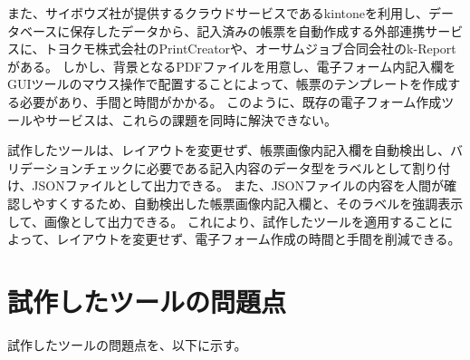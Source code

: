 また、サイボウズ社が提供するクラウドサービスであるkintone\cite{kintone}を利用し、データベースに保存したデータから、記入済みの帳票を自動作成する外部連携サービスに、トヨクモ株式会社のPrintCreator\cite{PrintCreator}や、オーサムジョブ合同会社のk-Report\cite{k-Report}がある。
しかし、背景となるPDFファイルを用意し、電子フォーム内記入欄をGUIツールのマウス操作で配置することによって、帳票のテンプレートを作成する必要があり、手間と時間がかかる。
このように、既存の電子フォーム作成ツールやサービスは、これらの課題を同時に解決できない。

試作したツールは、レイアウトを変更せず、帳票画像内記入欄を自動検出し、バリデーションチェックに必要である記入内容のデータ型をラベルとして割り付け、JSONファイルとして出力できる。
また、JSONファイルの内容を人間が確認しやすくするため、自動検出した帳票画像内記入欄と、そのラベルを強調表示して、画像として出力できる。
これにより、試作したツールを適用することによって、レイアウトを変更せず、電子フォーム作成の時間と手間を削減できる。

\section{試作したツールの問題点}\label{sec:problems}
試作したツールの問題点を、以下に示す。


